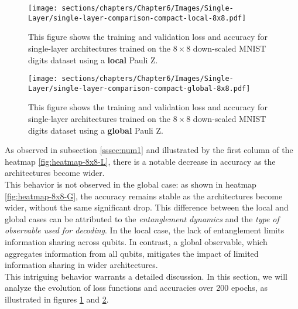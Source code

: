 \begin{figure}[h]
    \centering
    \texttt{[image: sections/chapters/Chapter6/Images/Single-Layer/single-layer-comparison-compact-local-8x8.pdf]}
    \caption{This figure shows the training and validation loss and accuracy for single-layer architectures
    trained on the $8\times8$ down-scaled MNIST digits dataset using a \textbf{local} Pauli Z.}
    \label{fig:Single-loss-local}
\end{figure}

\begin{figure}[h]
    \centering
    \texttt{[image: sections/chapters/Chapter6/Images/Single-Layer/single-layer-comparison-compact-global-8x8.pdf]}
    \caption{This figure shows the training and validation loss and accuracy for single-layer architectures
    trained on the $8\times8$ down-scaled MNIST digits dataset using a \textbf{global} Pauli Z.}
    \label{fig:Single-loss-global}
\end{figure}


As observed in subsection \ref{sssec:num1} and illustrated by the first column of the heatmap 
\ref{fig:heatmap-8x8-L}, there is a notable decrease in accuracy as the architectures become wider.\\
This behavior is not observed in the global case: as shown in heatmap \ref{fig:heatmap-8x8-G}, 
the accuracy remains stable as the architectures become wider, without the same significant drop.
This difference between the local and global cases can be attributed to the \textit{entanglement dynamics} and 
the \textit{type of observable used for decoding}. 
In the local case, the lack of entanglement limits information sharing across qubits. 
In contrast, a global observable, which aggregates information from all qubits, mitigates the 
impact of limited information sharing in wider architectures.\\

This intriguing behavior warrants a detailed discussion. 
In this section, we will analyze the evolution of loss functions and accuracies over 200 epochs, 
as illustrated in figures \ref{fig:Single-loss-local} and \ref{fig:Single-loss-global}.

